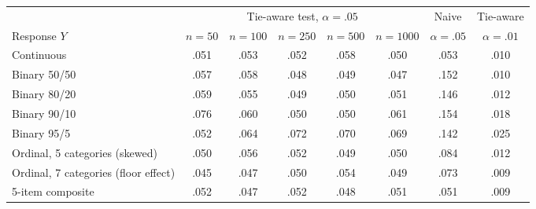 \begin{tabular}{lccccccc}
\toprule
 & \multicolumn{5}{c}{Tie-aware test, $\alpha = .05$} & Naive & Tie-aware \\
\cmidrule(lr){2-6}
Response $Y$ & $n=50$ & $n=100$ & $n=250$ & $n=500$ & $n=1000$ & $\alpha = .05$ & $\alpha = .01$ \\
\midrule
Continuous & .051 & .053 & .052 & .058 & .050 & .053 & .010 \\
Binary 50/50 & .057 & .058 & .048 & .049 & .047 & .152 & .010 \\
Binary 80/20 & .059 & .055 & .049 & .050 & .051 & .146 & .012 \\
Binary 90/10 & .076 & .060 & .050 & .050 & .061 & .154 & .018 \\
Binary 95/5 & .052 & .064 & .072 & .070 & .069 & .142 & .025 \\
Ordinal, 5 categories (skewed) & .050 & .056 & .052 & .049 & .050 & .084 & .012 \\
Ordinal, 7 categories (floor effect) & .045 & .047 & .050 & .054 & .049 & .073 & .009 \\
5-item composite & .052 & .047 & .052 & .048 & .051 & .051 & .009 \\
\bottomrule
\end{tabular}
